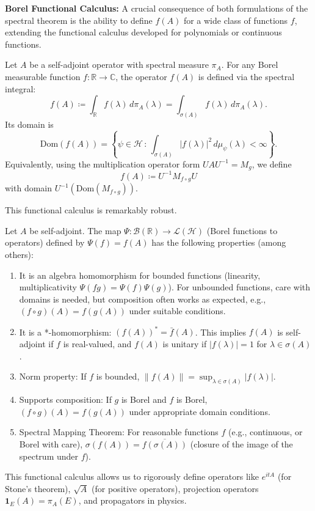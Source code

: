 \textbf{Borel Functional Calculus:}
A crucial consequence of both formulations of the spectral theorem is the ability to define $f(A)$ for a wide class of functions $f$, extending the functional calculus developed for polynomials or continuous functions.

\begin{definition}
Let $A$ be a self-adjoint operator with spectral measure $\pi_A$. For any Borel measurable function $f: \mathbb{R} \to \mathbb{C}$, the operator $f(A)$ is defined via the spectral integral:
\[ f(A) \coloneqq \int_{\mathbb{R}} f(\lambda) \, d\pi_A(\lambda) = \int_{\sigma(A)} f(\lambda) \, d\pi_A(\lambda). \]
Its domain is
\[ \text{Dom}(f(A)) = \left\{ \psi \in \mathcal{H} \,:\, \int_{\sigma(A)} |f(\lambda)|^2 \, d\mu_\psi(\lambda) < \infty \right\}. \]
Equivalently, using the multiplication operator form $U A U^{-1} = M_g$, we define
\[ f(A) \coloneqq U^{-1} M_{f \circ g} U \]
with domain $U^{-1}(\text{Dom}(M_{f \circ g}))$.
\end{definition}

This functional calculus is remarkably robust.

\begin{theorem}
Let $A$ be self-adjoint. The map $\Psi: \mathcal{B}(\mathbb{R}) \to \mathcal{L}(\mathcal{H})$ (Borel functions to operators) defined by $\Psi(f) = f(A)$ has the following properties (among others):
\begin{enumerate}
    \item It is an algebra homomorphism for bounded functions (linearity, multiplicativity $\Psi(fg)=\Psi(f)\Psi(g)$). For unbounded functions, care with domains is needed, but composition often works as expected, e.g., $(f \circ g)(A) = f(g(A))$ under suitable conditions.
    \item It is a *-homomorphism: $(f(A))^* = \bar{f}(A)$. This implies $f(A)$ is self-adjoint if $f$ is real-valued, and $f(A)$ is unitary if $|f(\lambda)|=1$ for $\lambda \in \sigma(A)$.
    \item Norm property: If $f$ is bounded, $\|f(A)\| = \sup_{\lambda \in \sigma(A)} |f(\lambda)|$.
    \item Supports composition: If $g$ is Borel and $f$ is Borel, $(f \circ g)(A) = f(g(A))$ under appropriate domain conditions.
    \item Spectral Mapping Theorem: For reasonable functions $f$ (e.g., continuous, or Borel with care), $\sigma(f(A)) = \overline{f(\sigma(A))}$ (closure of the image of the spectrum under $f$).
\end{enumerate}
\end{theorem}
This functional calculus allows us to rigorously define operators like $e^{itA}$ (for Stone's theorem), $\sqrt{A}$ (for positive operators), projection operators $\mathbf{1}_E(A) = \pi_A(E)$, and propagators in physics.
